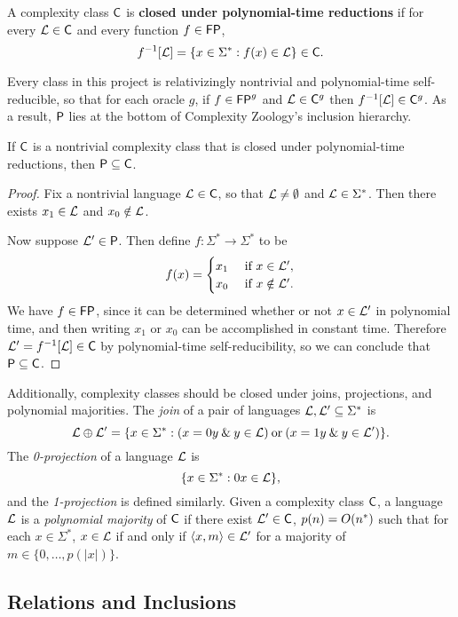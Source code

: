 \begin{definition}
A complexity class $\mathsf{C}$ is \textbf{closed under polynomial-time reductions} if for
every
$\mathcal{L}\in\mathsf{C}$ and every function $f\in\mathsf{FP}$,
\[
f^{-1}[\mathcal{L}]=\{x\in\Sigma^*:f(x)\in\mathcal{L}\}\in\mathsf{C}.
\]
\end{definition}

Every class in this project is relativizingly nontrivial and polynomial-time
self-reducible, so that for each oracle $g$, if $f\in\mathsf{FP}^g$ and $\mathcal{L}\in\mathsf{C}^g$
then $f^{-1}[\mathcal{L}]\in\mathsf{C}^g$. As a result, $\mathsf{P}$ lies at
the bottom of Complexity Zoology's inclusion hierarchy.

\begin{proposition}
If $\mathsf{C}$ is a nontrivial complexity class that is closed under polynomial-time 
reductions, then
$\mathsf{P}\subseteq\mathsf{C}$.
\end{proposition}

\begin{proof}
Fix a nontrivial language $\mathcal{L}\in\mathsf{C}$, so that $\mathcal{L}\neq\emptyset$ and
$\mathcal{L}\in\Sigma^*$. Then there exists $x_1\in\mathcal{L}$ and $x_0\notin\mathcal{L}$.

Now suppose $\mathcal{L}^\prime\in\mathsf{P}$. Then define $f:\Sigma^*\rightarrow\Sigma^*$ to
be
\[
f(x)=\begin{cases}x_1&\text{ if }x\in\mathcal{L}^\prime, \\
x_0&\text{ if }x\notin\mathcal{L}^\prime.\end{cases}
\]
We have $f\in\mathsf{FP}$, since it can be determined whether or not $x\in\mathcal{L}^\prime$ in
polynomial time, and then writing $x_1$ or $x_0$ can be accomplished in constant
time. Therefore $\mathcal{L}^\prime=f^{-1}[\mathcal{L}]\in\mathsf{C}$ by polynomial-time
self-reducibility, so we can conclude that $\mathsf{P}\subseteq\mathsf{C}$.
\end{proof}

Additionally, complexity classes should be closed under joins, projections, and 
polynomial majorities. The \textit{join} of a pair of languages 
$\mathcal{L},\mathcal{L}^\prime\subseteq\Sigma^*$ is
\[
\mathcal{L}\oplus\mathcal{L}^\prime=\{x\in\Sigma^*:(x=0y\mathbin{\&} y\in\mathcal{L})\mathbin{\text{or}}(x=1y\mathbin{\&}
y\in\mathcal{L}^\prime)\}.
\]
The \textit{0-projection} of a language $\mathcal{L}$ is
\[
\{x\in\Sigma^*:0x\in\mathcal{L}\},
\]
and the \textit{1-projection} is defined similarly. Given a complexity class $\mathsf{C}$,
a language $\mathcal{L}$ is a \textit{polynomial majority} of $\mathsf{C}$ if there exist 
$\mathcal{L}^\prime\in\mathsf{C}$, $p(n)=O(n^*)$ such that for each $x\in\Sigma^*$, $x\in\mathcal{L}$ if 
and only if $\left\langle x,m\right\rangle\in\mathcal{L}^\prime$ for a majority of $m\in\{0,\ldots,p(|x|)\}$.

\subsection{Relations and Inclusions}

